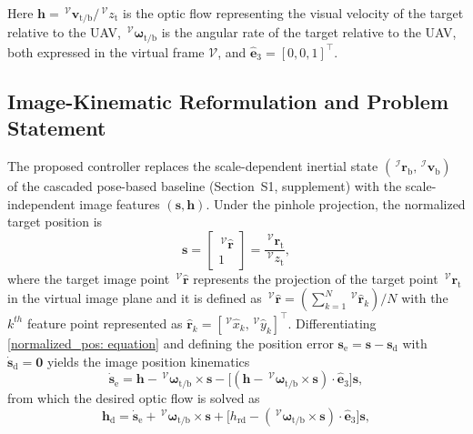Here $\boldsymbol{h} = \,^\mathcal{V} \boldsymbol{v}_{\text{t/b}}/\,^\mathcal{V} z_{\text{t}}$ is the optic flow representing the visual velocity of the target relative to the UAV, $\,^\mathcal{V} \boldsymbol{\omega}_{\text{t/b}}$ is the angular rate of the target relative to the UAV, both expressed in the virtual frame $\mathcal{V}$, and $\hat{\boldsymbol{e}}_3=[0,0,1]^\top$.
 

\subsection{Image-Kinematic Reformulation and Problem Statement} \label{problem statement: section}
The proposed controller replaces the scale-dependent inertial state $(\,^\mathcal{I}\boldsymbol{r}_\text{b},\,^\mathcal{I}\boldsymbol{v}_\text{b})$ of the cascaded pose-based baseline (Section~S1, supplement) with the scale-independent image features $(\boldsymbol{s},\boldsymbol{h})$. Under the pinhole projection, the normalized target position is
\begin{equation} \label{normalized_pos: equation}
    \boldsymbol{s} = \begin{bmatrix}\,^\mathcal{V}\hat{\boldsymbol{r}}\\ 1\end{bmatrix} = \frac{\,^\mathcal{V}\boldsymbol{r}_\text{t}}{\,^\mathcal{V}z_\text{t}},
\end{equation}
where the target image point $\,^\mathcal{V}\boldsymbol{\hat{r}}$ represents the projection of the target point $\,^\mathcal{V}\boldsymbol{r}_{\text{t}}$ in the virtual image plane and it is defined as $\,^\mathcal{V}\boldsymbol{\hat{r}} = \left(\sum^{N}_{k=1} \,^\mathcal{V}\boldsymbol{\hat{r}}_k \right)/N$ with the $k^{th}$ feature point represented as $\boldsymbol{\hat{r}}_k = [\,^\mathcal{V}\hat{x}_k, \,^\mathcal{V}\hat{y}_k]^{\top}$.
Differentiating \eqref{normalized_pos: equation} and defining the position error $\boldsymbol{s}_\text{e}=\boldsymbol{s}-\boldsymbol{s}_\text{d}$ with $\dot{\boldsymbol{s}}_\text{d}=\boldsymbol{0}$ yields the image position kinematics
\begin{equation} \label{s_e_dot: equation}
    \dot{\boldsymbol{s}}_\text{e} = \boldsymbol{h} - \,^\mathcal{V}\boldsymbol{\omega}_\text{t/b}\times\boldsymbol{s} - \big[(\boldsymbol{h}-\,^\mathcal{V}\boldsymbol{\omega}_\text{t/b}\times\boldsymbol{s})\cdot\hat{\boldsymbol{e}}_3\big]\boldsymbol{s},
\end{equation}
from which the desired optic flow is solved as
\begin{equation} \label{h_des: equation}
    \boldsymbol{h}_\text{d} = \dot{\boldsymbol{s}}_\text{e} + \,^\mathcal{V}\boldsymbol{\omega}_\text{t/b}\times\boldsymbol{s} + \big[h_\text{rd} - (\,^\mathcal{V}\boldsymbol{\omega}_\text{t/b}\times\boldsymbol{s})\cdot\hat{\boldsymbol{e}}_3\big]\boldsymbol{s},
\end{equation}
